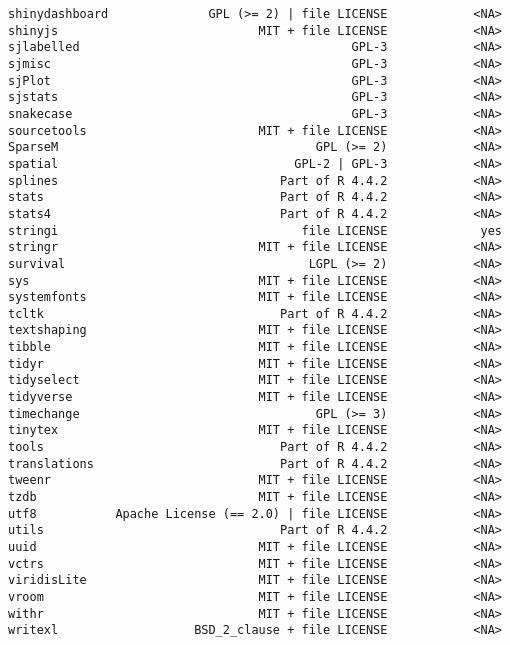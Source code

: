 \documentclass[
  letterpaper,
  DIV=11,
  numbers=noendperiod]{scrreprt}
\begin{document}
\begin{verbatim}
shinydashboard              GPL (>= 2) | file LICENSE            <NA>
shinyjs                            MIT + file LICENSE            <NA>
sjlabelled                                      GPL-3            <NA>
sjmisc                                          GPL-3            <NA>
sjPlot                                          GPL-3            <NA>
sjstats                                         GPL-3            <NA>
snakecase                                       GPL-3            <NA>
sourcetools                        MIT + file LICENSE            <NA>
SparseM                                    GPL (>= 2)            <NA>
spatial                                 GPL-2 | GPL-3            <NA>
splines                               Part of R 4.4.2            <NA>
stats                                 Part of R 4.4.2            <NA>
stats4                                Part of R 4.4.2            <NA>
stringi                                  file LICENSE             yes
stringr                            MIT + file LICENSE            <NA>
survival                                  LGPL (>= 2)            <NA>
sys                                MIT + file LICENSE            <NA>
systemfonts                        MIT + file LICENSE            <NA>
tcltk                                 Part of R 4.4.2            <NA>
textshaping                        MIT + file LICENSE            <NA>
tibble                             MIT + file LICENSE            <NA>
tidyr                              MIT + file LICENSE            <NA>
tidyselect                         MIT + file LICENSE            <NA>
tidyverse                          MIT + file LICENSE            <NA>
timechange                                 GPL (>= 3)            <NA>
tinytex                            MIT + file LICENSE            <NA>
tools                                 Part of R 4.4.2            <NA>
translations                          Part of R 4.4.2            <NA>
tweenr                             MIT + file LICENSE            <NA>
tzdb                               MIT + file LICENSE            <NA>
utf8           Apache License (== 2.0) | file LICENSE            <NA>
utils                                 Part of R 4.4.2            <NA>
uuid                               MIT + file LICENSE            <NA>
vctrs                              MIT + file LICENSE            <NA>
viridisLite                        MIT + file LICENSE            <NA>
vroom                              MIT + file LICENSE            <NA>
withr                              MIT + file LICENSE            <NA>
writexl                   BSD_2_clause + file LICENSE            <NA>

\end{verbatim}
\end{document}
